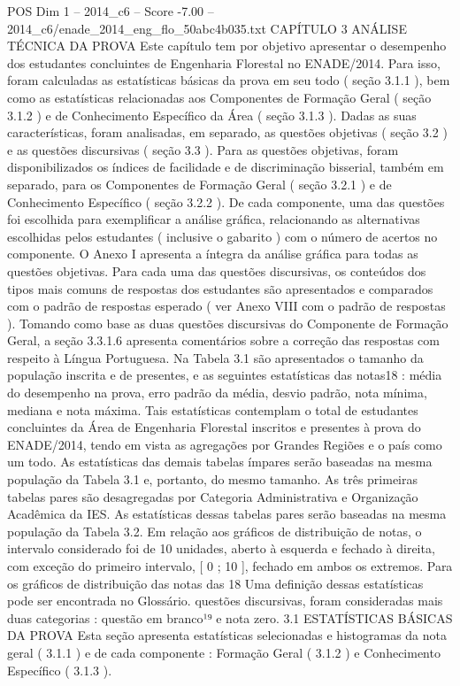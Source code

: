 \begin{textsample}{POS Dim 1 – 2014\_c6 – Score -7.00 – 2014\_c6/enade\_2014\_eng\_flo\_50abc4b035.txt}  \label{ex:f1_pos_427}
CAPÍTULO 3 ANÁLISE TÉCNICA DA PROVA Este capítulo tem por objetivo apresentar o desempenho dos estudantes concluintes de Engenharia Florestal no ENADE/2014.
Para isso, foram calculadas as estatísticas básicas da prova em seu todo ( seção 3.1.1 ), bem como as estatísticas relacionadas aos Componentes de Formação Geral ( seção 3.1.2 ) e de Conhecimento Específico da Área ( seção 3.1.3 ).
Dadas as suas características, foram analisadas, em separado, as questões objetivas ( seção 3.2 ) e as questões discursivas ( seção 3.3 ).
Para as questões objetivas, foram disponibilizados os índices de facilidade e de discriminação bisserial, também em separado, para os Componentes de Formação Geral ( seção 3.2.1 ) e de Conhecimento Específico ( seção 3.2.2 ).
De cada componente, uma das questões foi escolhida para exemplificar a análise gráfica, relacionando as alternativas escolhidas pelos estudantes ( inclusive o gabarito ) com o número de acertos no componente.
O Anexo I apresenta a íntegra da análise gráfica para todas as questões objetivas.
Para cada uma das questões discursivas, os conteúdos dos tipos mais comuns de respostas dos estudantes são apresentados e comparados com o padrão de respostas esperado ( ver Anexo VIII com o padrão de respostas ).
Tomando como base as duas questões discursivas do Componente de Formação Geral, a seção 3.3.1.6 apresenta comentários sobre a correção das respostas com respeito à Língua Portuguesa.
Na Tabela 3.1 são apresentados o tamanho da população inscrita e de presentes, e as seguintes estatísticas das notas18 : média do desempenho na prova, erro padrão da média, desvio padrão, nota mínima, mediana e nota máxima.
Tais estatísticas contemplam o total de estudantes concluintes da Área de Engenharia Florestal inscritos e presentes à prova do ENADE/2014, tendo em vista as agregações por Grandes Regiões e o país como um todo.
As estatísticas das demais tabelas ímpares serão baseadas na mesma população da Tabela 3.1 e, portanto, do mesmo tamanho.
As três primeiras tabelas pares são desagregadas por Categoria Administrativa e Organização Acadêmica da IES.
As estatísticas dessas tabelas pares serão baseadas na mesma população da Tabela 3.2.
Em relação aos gráficos de distribuição de notas, o intervalo considerado foi de 10 unidades, aberto à esquerda e fechado à direita, com exceção do primeiro intervalo, [ 0 ; 10 ], fechado em ambos os extremos.
Para os gráficos de distribuição das notas das 18 Uma definição dessas estatísticas pode ser encontrada no Glossário. questões discursivas, foram consideradas mais duas categorias : questão em branco¹⁹ e nota zero. 3.1 ESTATÍSTICAS BÁSICAS DA PROVA Esta seção apresenta estatísticas selecionadas e histogramas da nota geral ( 3.1.1 ) e de cada componente : Formação Geral ( 3.1.2 ) e Conhecimento Específico ( 3.1.3 ).

\end{textsample}
